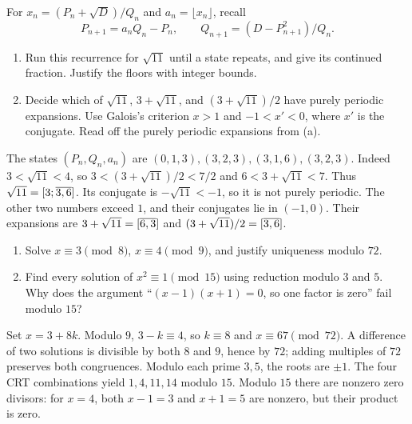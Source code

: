 \studentbreak
{}
For $x_n=(P_n+\sqrt D)/Q_n$ and $a_n=\lfloor x_n\rfloor$, recall
\[
P_{n+1}=a_nQ_n-P_n,\qquad Q_{n+1}=(D-P_{n+1}^2)/Q_n.
\]
\begin{enumerate}
\item Run this recurrence for $\sqrt{11}$ until a state repeats, and
give its continued fraction. Justify the floors with integer bounds.
\item Decide which of $\sqrt{11}$, $3+\sqrt{11}$, and
$(3+\sqrt{11})/2$ have purely periodic expansions. Use Galois's
criterion $x>1$ and $-1<x'<0$, where $x'$ is the conjugate.
Read off the purely periodic expansions from (a). 
\end{enumerate}
\begin{solution}
The states $(P_n,Q_n,a_n)$ are
$(0,1,3),(3,2,3),(3,1,6),(3,2,3)$.
Indeed $3<\sqrt{11}<4$, so
$3<(3+\sqrt{11})/2<7/2$ and $6<3+\sqrt{11}<7$.
Thus $\sqrt{11}=[3;\overline{3,6}]$.
Its conjugate is $-\sqrt{11}<-1$, so it is not purely periodic.
The other two numbers exceed $1$, and their conjugates lie in $(-1,0)$.
Their expansions are $3+\sqrt{11}=[\overline{6,3}]$ and
$(3+\sqrt{11})/2=[\overline{3,6}]$.
\end{solution}

\begin{enumerate}
\item Solve $x\equiv3\pmod8$, $x\equiv4\pmod9$, and justify uniqueness
modulo $72$. 
\item Find every solution of $x^2\equiv1\pmod{15}$ using reduction
modulo $3$ and $5$. Why does the argument
``$(x-1)(x+1)=0$, so one factor is zero'' fail modulo $15$? 
\end{enumerate}
\begin{solution}
Set $x=3+8k$. Modulo $9$, $3-k\equiv4$, so $k\equiv8$ and
$x\equiv67\pmod{72}$. A difference of two solutions is divisible by
both $8$ and $9$, hence by $72$; adding multiples of $72$ preserves both
congruences. Modulo each prime $3,5$, the roots are $\pm1$.
The four CRT combinations yield $1,4,11,14$ modulo $15$.
Modulo $15$ there are nonzero zero divisors: for $x=4$,
both $x-1=3$ and $x+1=5$ are nonzero, but their product is zero.
\end{solution}

